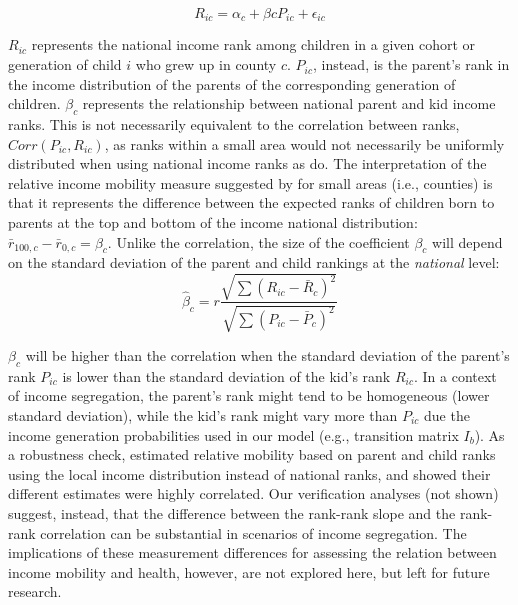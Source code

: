 \documentclass[class=article, crop=false, 12pt]{standalone}
\begin{document}
\vspace{-1mm}
\begin{equation}
    R_{ic} = \alpha_c +\beta{c} P_{ic} + \epsilon_{ic}
\end{equation}

$R_{ic}$ represents the national income rank among children in a given cohort or generation of child $i$ who grew up in county $c$. $P_{ic}$, instead, is the parent's rank in the income distribution of the parents of the corresponding generation of children. $\beta_c$ represents the relationship between national parent and kid income ranks. This is not necessarily equivalent to the correlation between ranks, $Corr(P_{ic}, R_{ic})$, as ranks within a small area would not necessarily be uniformly distributed when using national income ranks as \citet{chetty2014} do. The interpretation of the relative income mobility measure suggested by \citet{chetty2014} for small areas (i.e., counties) is that it represents the difference between the expected ranks of children born to parents at the top and bottom of the income national distribution: $\bar{r}_{100,c} - \bar{r}_{0,c} = \beta_{c}$. Unlike the correlation, the size of the coefficient $\beta_{c}$ will depend on the standard deviation of the parent and child rankings at the \textit{national} level:
\vspace{-1mm}
\begin{equation}\label{ch04:eq_income_mobility}
    \hat{\beta}_c = r \frac{\sqrt{\sum (R_{ic} - \bar{R}_c)^2}}{\sqrt{\sum (P_{ic} - \bar{P}_c)^2}}
\end{equation}

$\beta_{c}$ will be higher than the correlation when the standard deviation of the parent's rank $P_{ic}$ is lower than the standard deviation of the kid's rank $R_{ic}$. In a context of income segregation, the parent's rank might tend to be homogeneous (lower standard deviation), while the kid's rank might vary more than $P_{ic}$ due the income generation probabilities used in our model (e.g., transition matrix $I_b$). As a robustness check, \citet{chetty2014} estimated relative mobility based on parent and child ranks using the local income distribution instead of national ranks, and showed their different estimates were highly correlated. Our verification analyses (not shown) suggest, instead, that the difference between the rank-rank slope and the rank-rank correlation can be substantial in scenarios of income segregation. The implications of these measurement differences for assessing the relation between income mobility and health, however, are not explored here, but left for future research.
\end{document}
